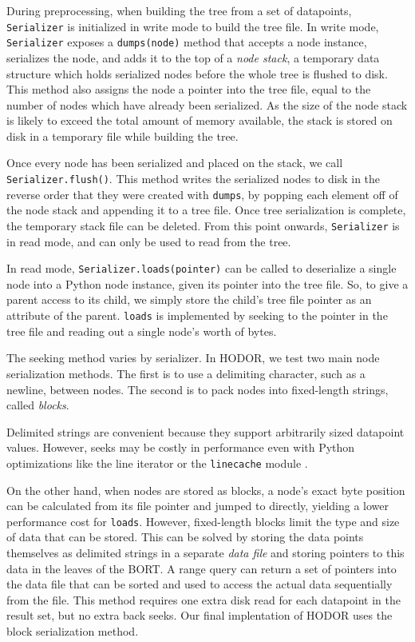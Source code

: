 \documentclass[11pt, oneside]{article}
\newcommand{\ms}{\texttt}
\begin{document}
During preprocessing, when building the tree from a set of datapoints,
\ms{Serializer} is initialized in write mode to build the tree file. In write
mode, \ms{Serializer} exposes a \ms{dumps(node)} method that accepts a node
instance, serializes the node, and adds it to the top of a \textit{node stack},
a temporary data structure which holds serialized nodes before the whole tree is
flushed to disk. This method also assigns the node a pointer into the tree file,
equal to the number of nodes which have already been serialized. As the size of
the node stack is likely to exceed the total amount of memory available, the
stack is stored on disk in a temporary file while building the tree. 

Once every node has been serialized and placed on the stack, we call
\ms{Serializer.flush()}. This method writes the serialized nodes to disk in the
reverse order that they were created with \ms{dumps}, by popping each element
off of the node stack and appending it to a tree file. Once tree serialization
is complete, the temporary stack file can be deleted. From this point onwards,
\ms{Serializer} is in read mode, and can only be used to read from the tree.

In read mode, \ms{Serializer.loads(pointer)} can be called to deserialize a
single node into a Python node instance, given its pointer into the tree file.
So, to give a parent access to its child, we simply store the child's tree file
pointer as an attribute of the parent. \ms{loads} is implemented by seeking to
the pointer in the tree file and reading out a single node's worth of bytes.

The seeking method varies by serializer. In HODOR, we test two main node
serialization methods. The first is to use a delimiting character, such as a
newline, between nodes. The second is to pack nodes into fixed-length strings,
called \textit{blocks}. 

Delimited strings are convenient because they support arbitrarily sized
datapoint values. However, seeks may be costly in performance even with Python
optimizations like the line iterator or the \ms{linecache} module
\cite{linecache}.

On the other hand, when nodes are stored as blocks, a node's exact byte
position can be calculated from its file pointer and jumped to directly,
yielding a lower performance cost for \ms{loads}. However, fixed-length
blocks limit the type and size of data that can be stored. This can be solved by
storing the data points themselves as delimited strings in a separate
\textit{data file} and storing pointers to this data in the leaves of the
BORT. A range query can return a set of pointers into the data file that can
be sorted and used to access the actual data sequentially from the file. This
method requires one extra disk read for each datapoint in the result set, but no
extra back seeks. Our final implentation of HODOR uses the block serialization
method.  
\end{document}
